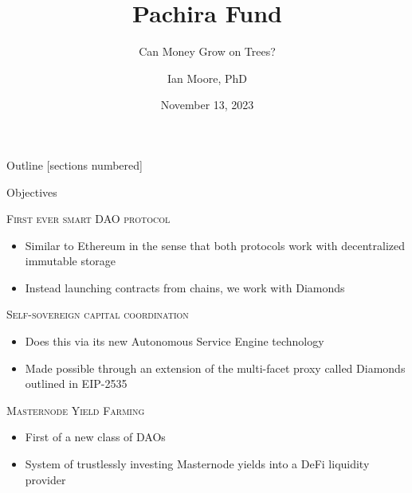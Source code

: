 \documentclass[10pt,xcolor=svgnames]{beamer} %
\title{Pachira Fund}
\author[Name]{Ian Moore, PhD \inst{$\dagger$}}%
\subtitle{Can Money Grow on Trees?}
\institute[shortinst]{\inst{$\dagger$} Tokenomics Researcher / Engineer @ Syscoin (email: imoore@syscoin.org) }
\date{November 13, 2023} %
\begin{document}
{
\maketitle
}%


\begin{frame}{Outline}
  [sections numbered] %
  \tableofcontents[hideallsubsections] %
\end{frame}

\begin{frame}{Objectives}

\begin{exampleblock}{\textsc{First ever smart DAO protocol}}
\begin{itemize}
  \item Similar to Ethereum in the sense that both protocols work with decentralized immutable storage
  \item Instead launching contracts from chains, we work with Diamonds
\end{itemize}  
\end{exampleblock}

\begin{exampleblock}{\textsc{Self-sovereign capital coordination}}
\begin{itemize}
  \item Does this via its new Autonomous Service Engine technology
  \item Made possible through an extension of the multi-facet proxy called Diamonds outlined in EIP-2535
\end{itemize}
\end{exampleblock}

\begin{exampleblock}{\textsc{Masternode Yield Farming}}
\begin{itemize}
  \item First of a new class of DAOs
  \item System of trustlessly investing Masternode yields into a DeFi liquidity provider
\end{itemize}
\end{exampleblock}

\end{frame}
\end{document}
